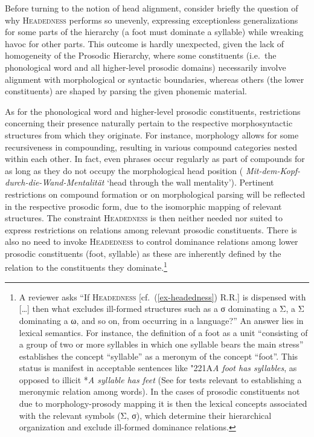 \documentclass[output=paper
 ,nobabel
 ,draftmode
 ,colorlinks, citecolor=brown
]{langscibook}
\begin{document}
Before turning to the notion of head alignment, consider briefly the question of why \textsc{Headedness} performs so unevenly, expressing exceptionless generalizations for some parts of the hierarchy (\eg a foot must dominate a syllable) while wreaking havoc for other parts. This outcome is hardly unexpected, given the lack of homogeneity of the Prosodic Hierarchy, where some constituents (i.e.\ the phonological word and all higher-level prosodic domains) necessarily involve alignment with morphological or syntactic boundaries, whereas others (the lower constituents) are shaped by parsing the given phonemic material. 

As for the phonological word and higher-level prosodic constituents, restrictions concerning their
presence naturally pertain to the respective morphosyntactic structures from which they
originate. For instance,  morphology allows for some recursiveness in compounding, resulting
in various compound categories nested within each other. In fact, even phrases occur regularly as
part of  compounds for as long as they do not occupy the morphological head position (\eg
\emph{Mit-dem-Kopf-durch-die-Wand-Mentalität} `head through the wall mentality'). Pertinent
restrictions on compound formation or on morphological parsing will be reflected in the respective
prosodic form, due to the isomorphic mapping of relevant structures. The constraint
\textsc{Headedness} is then neither needed nor suited to express restrictions on relations among relevant
prosodic constituents. There is also no need to invoke \textsc{Headedness} to control dominance
relations among lower prosodic constituents (foot, syllable) as these are inherently defined by the
relation to the constituents they dominate.\footnote{A reviewer asks ``If \textsc{Headedness} [cf.\
  (\ref{ex-headedness}) R.R.] is dispensed with [\dots] then what excludes ill-formed structures
  such as a σ dominating a Σ, a Σ dominating a ω, and so on, from occurring in a language?'' 
An answer lies in lexical semantics. For instance, the definition of a foot as a unit ``consisting
of a group of two or more syllables in which one syllable bears the main stress''
\citep[147]{Trask1996} establishes the concept ``syllable'' as a meronym of the concept
``foot''. This status is manifest in acceptable sentences like \char"221A\emph{A foot has
  syllables}, as opposed to illicit *\emph{A syllable has feet} (See
\citealp[157--180]{cruse:1986:lexical:semantics} for tests relevant to establishing a meronymic relation among words). In the cases of prosodic constituents not due to morphology-prosody mapping it is then the lexical concepts associated with the relevant symbols (\eg Σ, σ), which determine their hierarchical organization and exclude ill-formed dominance relations.}
\end{document}

